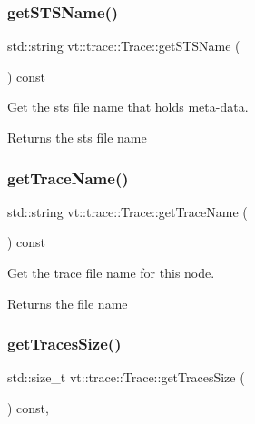 \subsubsection{\texorpdfstring{get\+S\+T\+S\+Name()}{getSTSName()}}
{\footnotesize\ttfamily std\+::string vt\+::trace\+::\+Trace\+::get\+S\+T\+S\+Name (\begin{DoxyParamCaption}{ }\end{DoxyParamCaption}) const\hspace{0.3cm}{\ttfamily [inline]}}



Get the sts file name that holds meta-\/data. 

\begin{DoxyReturn}{Returns}
the sts file name 
\end{DoxyReturn}
\mbox{\label{structvt_1_1trace_1_1_trace_a6825144c1fb635304c957dee8f667b4a}} 
\subsubsection{\texorpdfstring{get\+Trace\+Name()}{getTraceName()}}
{\footnotesize\ttfamily std\+::string vt\+::trace\+::\+Trace\+::get\+Trace\+Name (\begin{DoxyParamCaption}{ }\end{DoxyParamCaption}) const\hspace{0.3cm}{\ttfamily [inline]}}



Get the trace file name for this node. 

\begin{DoxyReturn}{Returns}
the file name 
\end{DoxyReturn}
\mbox{\label{structvt_1_1trace_1_1_trace_a502cebeb41c667ecce682191c69dacd5}} 
\subsubsection{\texorpdfstring{get\+Traces\+Size()}{getTracesSize()}}
{\footnotesize\ttfamily std\+::size\+\_\+t vt\+::trace\+::\+Trace\+::get\+Traces\+Size (\begin{DoxyParamCaption}{ }\end{DoxyParamCaption}) const\hspace{0.3cm}{\ttfamily [inline]}, {\ttfamily [private]}}



